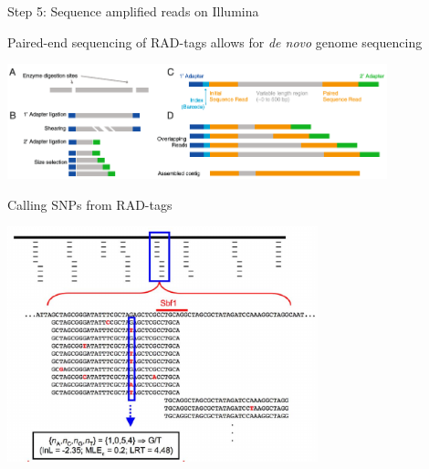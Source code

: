 \documentclass[presentation]{beamer}
\begin{document}
\begin{frame}[label=sec-2-1-7]{Step 5: Sequence amplified reads on Illumina}
\begin{center}
\begin{figure}[htb]
{
}
\end{figure}
\end{center}
\end{frame}




\begin{frame}[label=sec-2-1-8]{Paired-end sequencing of RAD-tags allows for \emph{de novo} genome sequencing}
\begin{center}
\includegraphics[width=11cm]{Pegadarju2013Fig1.png}



\tiny{\citep{Pegadaraju2013}}
\end{center}
\end{frame}

\begin{frame}[label=sec-2-1-9]{Calling SNPs from RAD-tags}
\begin{center}
\includegraphics[width=9cm]{HohenloheFig2a.png}



\tiny{\citep{Hohenlohe2010}}
\end{center}
\end{frame}
\end{document}
